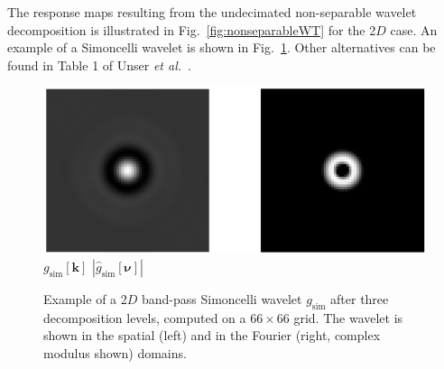 \documentclass[fleqn,a4paper,oneside,openany]{book}
\begin{document}
The response maps resulting from the undecimated non-separable wavelet decomposition is illustrated in Fig.~\ref{fig:nonseparableWT} for the 2$D$ case.
An example of a Simoncelli wavelet is shown in Fig.~\ref{fig:simoncelli}.
Other alternatives can be found in Table 1 of Unser \textit{et al.}~\cite{UCV2011}.
%
\begin{figure}
\centering
\includegraphics[trim = 0 0 0 0, clip, width=0.6\linewidth]{Simoncelli.png}\\
$g_{\text{sim}}[\boldsymbol{k}]$
\hspace{3.05cm}
$|\hat{g}_{\text{sim}}[\boldsymbol{\nu}]|$
\caption{Example of a 2$D$ band-pass Simoncelli wavelet $g_{\text{sim}}$ after three decomposition levels, computed on a $66\times 66$ grid.
The wavelet is shown in the spatial (left) and in the Fourier (right, complex modulus shown) domains.}
  \label{fig:simoncelli}
\end{figure}
%
\end{document}
